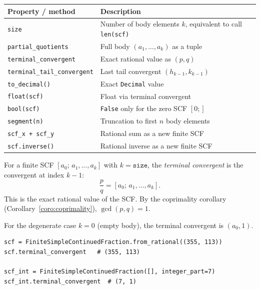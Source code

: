 \begin{center}
\begin{tabular}{ll}
  \toprule
  Property / method & Description \\
  \midrule
  \texttt{size} & Number of body elements $k$, equivalent to call \texttt{len(scf)} \\
  \texttt{partial\_quotients} & Full body $(a_1,\ldots,a_k)$ as a tuple \\
  \texttt{terminal\_convergent} & Exact rational value as $(p, q)$ \\
  \texttt{terminal\_tail\_convergent} & Last tail convergent $(h_{k-1}, k_{k-1})$ \\
  \texttt{to\_decimal()} & Exact \texttt{Decimal} value \\
  \texttt{float(scf)} & Float via terminal convergent \\
  \texttt{bool(scf)} & \texttt{False} only for the zero SCF $[0;]$ \\
  \texttt{segment(n)} & Truncation to first $n$ body elements \\
  \texttt{scf\_x + scf\_y} & Rational sum as a new finite SCF \\
  \texttt{scf.inverse()} & Rational inverse as a new finite SCF \\
  \bottomrule
\end{tabular}
\end{center}

\begin{definition}
  For a finite SCF $[a_0;\, a_1, \ldots, a_k]$ with $k = \texttt{size}$,
  the \emph{terminal convergent} is the convergent at index $k-1$:
  \[
    \frac{p}{q} = [a_0;\, a_1, \ldots, a_k].
  \]
  This is the exact rational value of the SCF.  By the coprimality
  corollary (Corollary~\ref{coro:coprimality}), $\gcd(p, q) = 1$.

  For the degenerate case $k = 0$ (empty body), the terminal convergent is
  $(a_0, 1)$.
\end{definition}

\begin{catenadef}
\begin{lstlisting}[style=python]
scf = FiniteSimpleContinuedFraction.from_rational((355, 113))
scf.terminal_convergent   # (355, 113)

scf_int = FiniteSimpleContinuedFraction([], integer_part=7)
scf_int.terminal_convergent  # (7, 1)
\end{lstlisting}
\end{catenadef}

